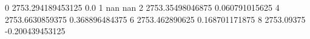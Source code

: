 0 2753.294189453125 0.0
1 nan nan
2 2753.35498046875 0.060791015625
4 2753.6630859375 0.368896484375
6 2753.462890625 0.168701171875
8 2753.09375 -0.200439453125
